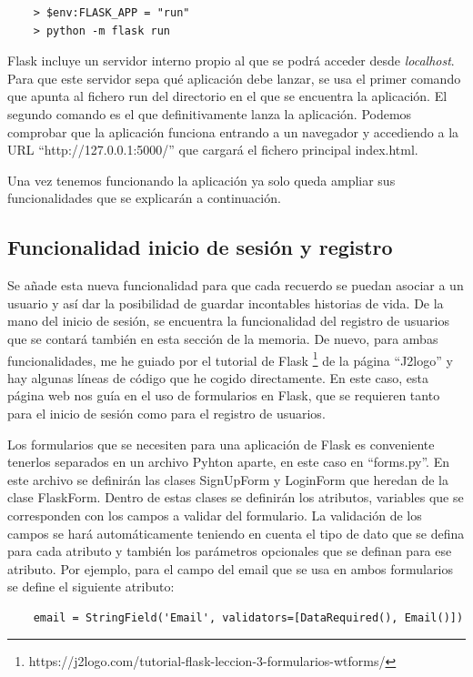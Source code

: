 \begin{verbatim}
	> $env:FLASK_APP = "run"
	> python -m flask run
\end{verbatim}

Flask incluye un servidor interno propio al que se podrá acceder desde \textit{localhost}. Para que este servidor sepa qué aplicación debe lanzar, se usa el primer comando que apunta al fichero run del directorio en el que se encuentra la aplicación. El segundo comando es el que definitivamente lanza la aplicación. Podemos comprobar que la aplicación funciona entrando a un navegador y accediendo a la URL ``http://127.0.0.1:5000/'' que cargará el fichero principal index.html. 

Una vez tenemos funcionando la aplicación ya solo queda ampliar sus funcionalidades que se explicarán a continuación. 


\subsection{Funcionalidad inicio de sesión y registro}

Se añade esta nueva funcionalidad para que cada recuerdo se puedan asociar a un usuario y así dar la posibilidad de guardar incontables historias de vida. De la mano del inicio de sesión, se encuentra la funcionalidad del registro de usuarios que se contará también en esta sección de la memoria. De nuevo, para ambas funcionalidades, me he guiado por el tutorial de Flask \footnote{https://j2logo.com/tutorial-flask-leccion-3-formularios-wtforms/} de la página ``J2logo'' y hay algunas líneas de código que he cogido directamente. En este caso, esta página web nos guía en el uso de formularios en Flask, que se requieren tanto para el inicio de sesión como para el registro de usuarios. 

Los formularios que se necesiten para una aplicación de Flask es conveniente tenerlos separados en un archivo Pyhton aparte, en este caso en ``forms.py''. En este archivo se definirán las clases SignUpForm y LoginForm que heredan de la clase FlaskForm. Dentro de estas clases se definirán los atributos, variables que se corresponden con los campos a validar del formulario. La validación de los campos se hará automáticamente teniendo en cuenta el tipo de dato que se defina para cada atributo y también los parámetros opcionales que se definan para ese atributo. Por ejemplo, para el campo del email que se usa en ambos formularios se define el siguiente atributo:

\begin{verbatim}
	email = StringField('Email', validators=[DataRequired(), Email()])
\end{verbatim}

